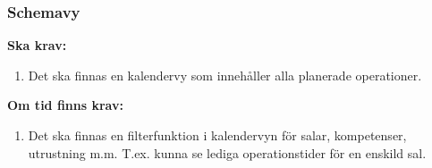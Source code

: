 \documentclass{article}
\begin{document}
\subsubsection{Schemavy}
\textbf{Ska krav: }
\begin{enumerate}
\item Det ska finnas en kalendervy som innehåller alla planerade operationer.
\end{enumerate}
\textbf{Om tid finns krav:}
\begin{enumerate}
\item Det ska finnas en filterfunktion i kalendervyn för salar, kompetenser, utrustning m.m. T.ex. kunna se lediga operationstider för en enskild sal.
\end{enumerate}




\appendix


\end{document}
